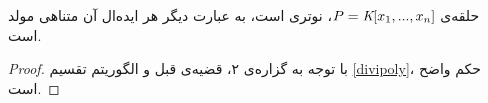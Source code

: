 \begin{theorem}
	\label{hilbert basis th}
حلقه‌ی 
$P = \textit{K}[x_{1},...,x_{n}]$،
نوتری است، به عبارت دیگر
هر ایده‌ال  آن متناهی مولد است. 
\end{theorem}
\begin{proof}
%
با توجه به گزاره‌ی ۲، قضیه‌ی قبل  و الگوریتم تقسیم 
\ref{divipoly}،
 حکم واضح است. 
\end{proof}

